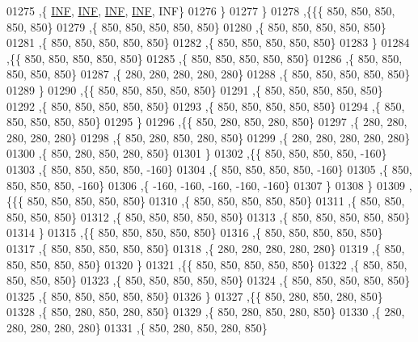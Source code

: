 \begin{DoxyCode}
01275    ,\{   \hyperlink{constants_8h_a12c2040f25d8e3a7b9e1c2024c618cb6}{INF},   \hyperlink{constants_8h_a12c2040f25d8e3a7b9e1c2024c618cb6}{INF},   \hyperlink{constants_8h_a12c2040f25d8e3a7b9e1c2024c618cb6}{INF},   \hyperlink{constants_8h_a12c2040f25d8e3a7b9e1c2024c618cb6}{INF},   INF\}
01276    \}
01277   \}
01278  ,\{\{\{   850,   850,   850,   850,   850\}
01279    ,\{   850,   850,   850,   850,   850\}
01280    ,\{   850,   850,   850,   850,   850\}
01281    ,\{   850,   850,   850,   850,   850\}
01282    ,\{   850,   850,   850,   850,   850\}
01283    \}
01284   ,\{\{   850,   850,   850,   850,   850\}
01285    ,\{   850,   850,   850,   850,   850\}
01286    ,\{   850,   850,   850,   850,   850\}
01287    ,\{   280,   280,   280,   280,   280\}
01288    ,\{   850,   850,   850,   850,   850\}
01289    \}
01290   ,\{\{   850,   850,   850,   850,   850\}
01291    ,\{   850,   850,   850,   850,   850\}
01292    ,\{   850,   850,   850,   850,   850\}
01293    ,\{   850,   850,   850,   850,   850\}
01294    ,\{   850,   850,   850,   850,   850\}
01295    \}
01296   ,\{\{   850,   280,   850,   280,   850\}
01297    ,\{   280,   280,   280,   280,   280\}
01298    ,\{   850,   280,   850,   280,   850\}
01299    ,\{   280,   280,   280,   280,   280\}
01300    ,\{   850,   280,   850,   280,   850\}
01301    \}
01302   ,\{\{   850,   850,   850,   850,  -160\}
01303    ,\{   850,   850,   850,   850,  -160\}
01304    ,\{   850,   850,   850,   850,  -160\}
01305    ,\{   850,   850,   850,   850,  -160\}
01306    ,\{  -160,  -160,  -160,  -160,  -160\}
01307    \}
01308   \}
01309  ,\{\{\{   850,   850,   850,   850,   850\}
01310    ,\{   850,   850,   850,   850,   850\}
01311    ,\{   850,   850,   850,   850,   850\}
01312    ,\{   850,   850,   850,   850,   850\}
01313    ,\{   850,   850,   850,   850,   850\}
01314    \}
01315   ,\{\{   850,   850,   850,   850,   850\}
01316    ,\{   850,   850,   850,   850,   850\}
01317    ,\{   850,   850,   850,   850,   850\}
01318    ,\{   280,   280,   280,   280,   280\}
01319    ,\{   850,   850,   850,   850,   850\}
01320    \}
01321   ,\{\{   850,   850,   850,   850,   850\}
01322    ,\{   850,   850,   850,   850,   850\}
01323    ,\{   850,   850,   850,   850,   850\}
01324    ,\{   850,   850,   850,   850,   850\}
01325    ,\{   850,   850,   850,   850,   850\}
01326    \}
01327   ,\{\{   850,   280,   850,   280,   850\}
01328    ,\{   850,   280,   850,   280,   850\}
01329    ,\{   850,   280,   850,   280,   850\}
01330    ,\{   280,   280,   280,   280,   280\}
01331    ,\{   850,   280,   850,   280,   850\}

\end{DoxyCode}
